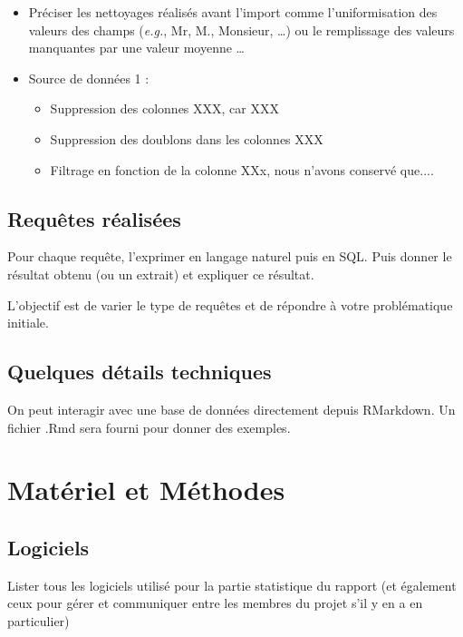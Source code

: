 \documentclass[mstat,12pt]{unswthesis}
\begin{document}
\begin{itemize}
\tightlist
\item
  Préciser les nettoyages réalisés avant l'import comme l'uniformisation
  des valeurs des champs (\emph{e.g.}, Mr, M., Monsieur, \ldots) ou le
  remplissage des valeurs manquantes par une valeur moyenne \ldots{}
\end{itemize}

\begin{itemize}
    \item  Source de données 1 :
    \begin{itemize} 
     \item Suppression des colonnes XXX, car XXX
     \item  Suppression des doublons dans les colonnes XXX
    \item  Filtrage en fonction de la colonne XXx, nous n'avons conservé que.... 
\end{itemize}
\end{itemize}

\section{Requêtes réalisées}\label{requuxeates-ruxe9alisuxe9es}

Pour chaque requête, l'exprimer en langage naturel puis en SQL. Puis
donner le résultat obtenu (ou un extrait) et expliquer ce résultat.

L'objectif est de varier le type de requêtes et de répondre à votre
problématique initiale.

\section{Quelques détails
techniques}\label{quelques-duxe9tails-techniques}

On peut interagir avec une base de données directement depuis RMarkdown.
Un fichier .Rmd sera fourni pour donner des exemples.

\chapter{Matériel et Méthodes}\label{matuxe9riel-et-muxe9thodes}

\section{Logiciels}\label{logiciels}

Lister tous les logiciels utilisé pour la partie statistique du rapport
(et également ceux pour gérer et communiquer entre les membres du projet
s'il y en a en particulier)
\end{document}
